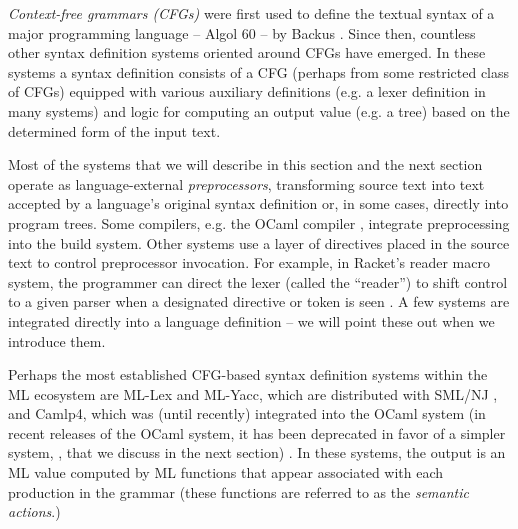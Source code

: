 \emph{Context-free grammars (CFGs)} were first used to define the textual syntax of a major programming language -- Algol 60 -- by Backus \cite{naur1963revised}. Since then, countless other syntax definition systems oriented around CFGs have emerged. In these systems a syntax definition consists of a CFG (perhaps from some restricted class of CFGs) equipped with various auxiliary definitions (e.g. a lexer definition in many systems) and logic for computing an output value (e.g. a tree) based on the determined form of the input text.

Most of the systems that we will describe in this section and the next section operate as language-external \emph{preprocessors}, transforming source text into text accepted by a language's original syntax definition or, in some cases, directly into program trees. Some compilers, e.g. the OCaml compiler \cite{ocaml-manual}, integrate preprocessing into the build system. Other systems use a layer of directives placed in the source text to control preprocessor invocation. For example, in Racket's reader macro system, the programmer can direct the lexer (called the ``reader'') to shift control to a given parser when a designated directive or token is seen \cite{Flatt:2012:CLR:2063176.2063195}. A few systems are integrated directly into a language definition -- we will point these out when we introduce them. 

Perhaps the most established CFG-based syntax definition systems within the ML ecosystem are ML-Lex  and ML-Yacc, which are distributed with SML/NJ \cite{TarditiDR:mly}, and Camlp4, which was (until recently)  integrated into  the OCaml system (in recent releases of the OCaml system, it has been deprecated in favor of a simpler system, , that we discuss in the next section) \cite{ocaml-manual}. In these systems, the output is an ML value computed by ML functions that appear associated with each production in the grammar (these functions are referred to as the \emph{semantic actions}.) 

